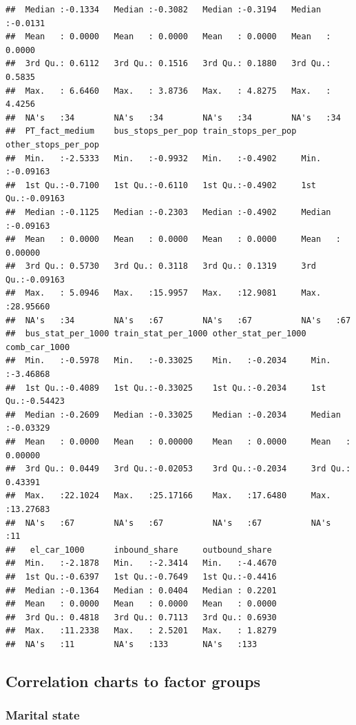 \documentclass[
]{article}
\begin{document}
\begin{verbatim}
##  Median :-0.1334   Median :-0.3082   Median :-0.3194   Median :-0.0131  
##  Mean   : 0.0000   Mean   : 0.0000   Mean   : 0.0000   Mean   : 0.0000  
##  3rd Qu.: 0.6112   3rd Qu.: 0.1516   3rd Qu.: 0.1880   3rd Qu.: 0.5835  
##  Max.   : 6.6460   Max.   : 3.8736   Max.   : 4.8275   Max.   : 4.4256  
##  NA's   :34        NA's   :34        NA's   :34        NA's   :34       
##  PT_fact_medium    bus_stops_per_pop train_stops_per_pop other_stops_per_pop
##  Min.   :-2.5333   Min.   :-0.9932   Min.   :-0.4902     Min.   :-0.09163   
##  1st Qu.:-0.7100   1st Qu.:-0.6110   1st Qu.:-0.4902     1st Qu.:-0.09163   
##  Median :-0.1125   Median :-0.2303   Median :-0.4902     Median :-0.09163   
##  Mean   : 0.0000   Mean   : 0.0000   Mean   : 0.0000     Mean   : 0.00000   
##  3rd Qu.: 0.5730   3rd Qu.: 0.3118   3rd Qu.: 0.1319     3rd Qu.:-0.09163   
##  Max.   : 5.0946   Max.   :15.9957   Max.   :12.9081     Max.   :28.95660   
##  NA's   :34        NA's   :67        NA's   :67          NA's   :67         
##  bus_stat_per_1000 train_stat_per_1000 other_stat_per_1000 comb_car_1000     
##  Min.   :-0.5978   Min.   :-0.33025    Min.   :-0.2034     Min.   :-3.46868  
##  1st Qu.:-0.4089   1st Qu.:-0.33025    1st Qu.:-0.2034     1st Qu.:-0.54423  
##  Median :-0.2609   Median :-0.33025    Median :-0.2034     Median :-0.03329  
##  Mean   : 0.0000   Mean   : 0.00000    Mean   : 0.0000     Mean   : 0.00000  
##  3rd Qu.: 0.0449   3rd Qu.:-0.02053    3rd Qu.:-0.2034     3rd Qu.: 0.43391  
##  Max.   :22.1024   Max.   :25.17166    Max.   :17.6480     Max.   :13.27683  
##  NA's   :67        NA's   :67          NA's   :67          NA's   :11        
##   el_car_1000      inbound_share     outbound_share   
##  Min.   :-2.1878   Min.   :-2.3414   Min.   :-4.4670  
##  1st Qu.:-0.6397   1st Qu.:-0.7649   1st Qu.:-0.4416  
##  Median :-0.1364   Median : 0.0404   Median : 0.2201  
##  Mean   : 0.0000   Mean   : 0.0000   Mean   : 0.0000  
##  3rd Qu.: 0.4818   3rd Qu.: 0.7113   3rd Qu.: 0.6930  
##  Max.   :11.2338   Max.   : 2.5201   Max.   : 1.8279  
##  NA's   :11        NA's   :133       NA's   :133
\end{verbatim}

\hypertarget{correlation-charts-to-factor-groups}{%
\subsection{Correlation charts to factor
groups}\label{correlation-charts-to-factor-groups}}

\hypertarget{marital-state}{%
\subsubsection{Marital state}\label{marital-state}}
\end{document}
